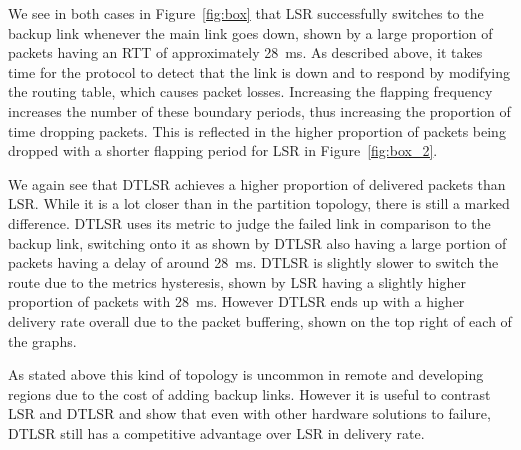 \documentclass[withindex,glossary,openany]{cam-thesis}
\begin{document}
We see in both cases in Figure~\ref{fig:box} that LSR successfully switches to the backup link whenever the main link goes down, shown by a large proportion of packets having an RTT of approximately \SI{28}{\ms}. As described above, it takes time for the protocol to detect that the link is down and to respond by modifying the routing table, which causes packet losses. Increasing the flapping frequency increases the number of these boundary periods, thus increasing the proportion of time dropping packets. This is reflected in the higher proportion of packets being dropped with a shorter flapping period for LSR in Figure~\ref{fig:box_2}.

We again see that DTLSR achieves a higher proportion of delivered packets than LSR. While it is a lot closer than in the partition topology, there is still a marked difference. DTLSR uses its metric to judge the failed link in comparison to the backup link, switching onto it as shown by DTLSR also having a large portion of packets having a delay of around \SI{28}{\ms}. DTLSR is slightly slower to switch the route due to the metrics hysteresis, shown by LSR having a slightly higher proportion of packets with \SI{28}{\ms}. However DTLSR ends up with a higher delivery rate overall due to the packet buffering, shown on the top right of each of the graphs.

As stated above this kind of topology is uncommon in remote and developing regions due to the cost of adding backup links. However it is useful to contrast LSR and DTLSR and show that even with other hardware solutions to failure, DTLSR still has a competitive advantage over LSR in delivery rate.



\end{document}
